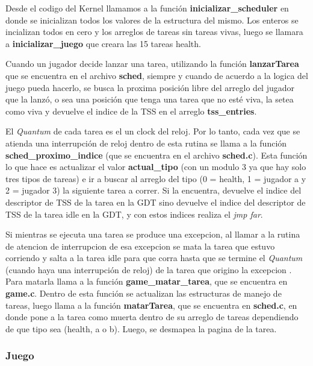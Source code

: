 Desde el codigo del Kernel llamamos a la función \textbf{inicializar_scheduler} en donde se inicializan todos los valores de la estructura del mismo. Los enteros se incializan todos en cero y los arreglos de tareas sin tareas vivas, luego se llamara a \textbf{inicializar_juego} que creara las 15 tareas health.

Cuando un jugador decide lanzar una tarea, utilizando la función \textbf{lanzarTarea} que se encuentra en el archivo \textbf{sched}, siempre y cuando de acuerdo a la logica del juego pueda hacerlo, se busca la proxima posición libre del arreglo del jugador que la lanzó, o sea una posición que tenga una tarea que no esté viva, la setea como viva y devuelve el indice de la TSS en el arreglo \textbf{tss_entries}.

El \textit{Quantum} de cada tarea es el un clock del reloj. Por lo tanto, cada vez que se atienda una interrupción de reloj dentro de esta rutina se llama a la función \textbf{sched_proximo_indice} (que se encuentra en el archivo \textbf{sched.c}). Esta función lo que hace es actualizar el valor \textbf{actual_tipo} (con un modulo 3 ya que hay solo tres tipos de tareas) e ir a buscar al arreglo del tipo (0 = health, 1 = jugador a y 2 = jugador 3) la siguiente tarea a correr. Si la encuentra, devuelve el indice del descriptor de TSS de la tarea en la GDT sino devuelve el indice del descriptor de TSS de la tarea idle en la GDT, y con estos indices realiza el \textit{jmp far}.

Si mientras se ejecuta una tarea se produce una excepcion, al llamar a la rutina de atencion de interrupcion de esa excepcion se mata la tarea que estuvo corriendo y salta a la tarea idle para que corra hasta que se termine el \textit{Quantum} (cuando haya una interrupción de reloj) de la tarea que origino la excepcion . Para matarla llama a la función \textbf{game_matar_tarea}, que se encuentra en \textbf{game.c}. Dentro de esta función se actualizan las estructuras de manejo de tareas, luego llama a la función \textbf{matarTarea}, que se encuentra en \textbf{sched.c}, en donde pone a la tarea como muerta dentro de su arreglo de tareas dependiendo de que tipo sea (health, a o b).
Luego, se desmapea la pagina de la tarea.


\subsubsection{Juego}


